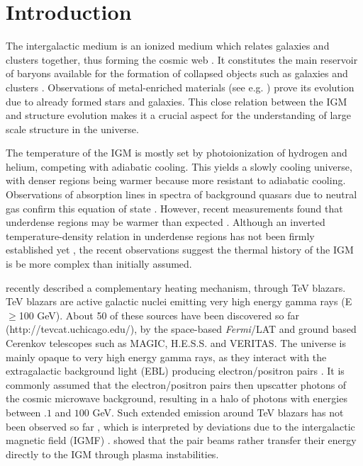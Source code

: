 \documentclass[twocolumns]{emulateapj}
\begin{document}
\section{Introduction}
The intergalactic medium is an ionized medium which relates galaxies and clusters together, thus forming the cosmic web \citep{1996Natur.380..603B}. It constitutes the main reservoir of baryons available for the formation of collapsed objects such as galaxies and clusters \citep{1997ApJ...489....7R}. Observations of metal-enriched materials (see e.g. \citet{2009A&A...493..409S,2010MNRAS.407.2063W}) prove its evolution due to already formed stars and galaxies. This close relation between the IGM and structure evolution makes it a  crucial aspect for the understanding of large scale structure in the universe.

The temperature of the IGM is mostly set by photoionization of hydrogen  and helium, competing with adiabatic cooling. This yields a slowly cooling universe, with denser regions being warmer because more resistant to adiabatic cooling. Observations of absorption lines in spectra of background quasars due to neutral gas confirm this equation of state \citep{2000MNRAS.318..817S,2000ApJ...534...41R,2012ApJ...757L..30R}. However, recent measurements found that underdense regions may be warmer than expected \citep{2009MNRAS.399L..39V,2008MNRAS.386.1131B,2014MNRAS.441.1916B}. Although an inverted temperature-density relation in underdense regions has not been firmly established yet \citep{2014MNRAS.tmp...52B}, the recent observations suggest the thermal history of the IGM is be more complex than initially assumed.



\citet{2012ApJ...752...22B} recently described a complementary heating mechanism, through TeV blazars. TeV blazars are active galactic nuclei emitting  very high energy gamma rays (E$\ge$100 GeV). About 50 of these sources have been discovered so far (http://tevcat.uchicago.edu/), by the space-based \textit{Fermi}/LAT and ground based Cerenkov telescopes such as MAGIC, H.E.S.S. and VERITAS. The universe is mainly opaque to  very high energy  gamma rays, as they interact with the extragalactic background light (EBL) producing electron/positron pairs \citep{1967PhRv..155.1408G,1992ApJ...390L..49S}.  It is commonly assumed that the electron/positron pairs then upscatter photons of the cosmic microwave background, resulting in  a halo of photons with energies between $.1$ and $100$ GeV. Such extended emission around TeV blazars has not been observed so far \citep{2010A&A...524A..77A,2014arXiv1401.2915H}, which is interpreted by deviations due to the intergalactic magnetic field (IGMF) \citep{2013A&ARv..21...62D,2012ApJ...747L..14V,2011ApJ...733L..21D}. \citet{2012ApJ...752...22B} showed that the pair beams rather transfer their energy directly to the IGM through plasma instabilities.
\end{document}
